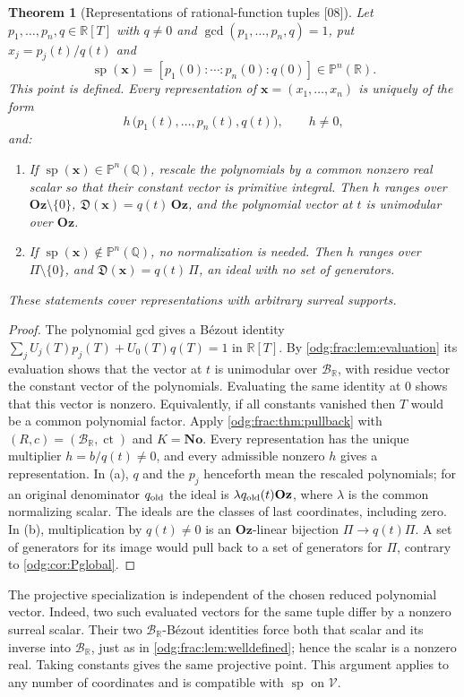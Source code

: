\documentclass[11pt,oneside]{article}
\numberwithin{equation}{section}
\newtheorem{theorem}{Theorem}[section]
\theoremstyle{definition}
\theoremstyle{remark}
\newcommand{\No}{\mathbf{No}}
\newcommand{\Oz}{\mathbf{Oz}}
\newcommand{\Q}{\mathbb Q}
\newcommand{\R}{\mathbb R}
\newcommand{\BR}{\mathcal B_{\R}}
\newcommand{\ct}{\operatorname{ct}}
\newcommand{\src}[1]{\textup{\textsf{\small[#1]}}}
\newcommand{\Den}{\mathfrak D}
\newcommand{\spz}{\operatorname{sp}}
\newcommand{\Vreg}{\mathcal V}
\begin{document}
\begin{theorem}[Representations of rational-function tuples \src{08}]\label{odg:frac:thm:main}
Let $p_1,\ldots,p_n,q\in\R[T]$ with $q\ne0$ and $\gcd(p_1,\ldots,p_n,q)=1$, put
$x_j=p_j(t)/q(t)$ and
\[
 \spz(\mathbf x)=[p_1(0):\cdots:p_n(0):q(0)]\in\mathbb P^n(\R).
\]
This point is defined. Every representation of $\mathbf x=(x_1,\ldots,x_n)$ is
uniquely of the form
\[
 h\,\bigl(p_1(t),\ldots,p_n(t),q(t)\bigr),\qquad h\ne0,
\]
and:
\begin{enumerate}[label=\textup{(\alph*)},leftmargin=*]
\item If $\spz(\mathbf x)\in\mathbb P^n(\Q)$, rescale the polynomials by a
common nonzero real scalar so that their constant vector is primitive integral.
Then $h$ ranges over $\Oz\setminus\{0\}$, $\Den(\mathbf x)=q(t)\,\Oz$, and the
polynomial vector at $t$ is unimodular over $\Oz$.
\item If $\spz(\mathbf x)\notin\mathbb P^n(\Q)$, no normalization is needed.
Then $h$ ranges over $\Pi\setminus\{0\}$, and $\Den(\mathbf x)=q(t)\,\Pi$, an
ideal with no set of generators.
\end{enumerate}
These statements cover representations with arbitrary surreal supports.
\end{theorem}
\begin{proof}
The polynomial gcd gives a B\'ezout identity
$\sum_jU_j(T)p_j(T)+U_0(T)q(T)=1$ in $\R[T]$. By \cref{odg:frac:lem:evaluation}
its evaluation shows that the vector at $t$ is unimodular over $\BR$, with
residue vector the constant vector of the polynomials. Evaluating the same
identity at $0$ shows that this vector is nonzero. Equivalently, if all
constants vanished then $T$ would be a common polynomial factor. Apply
\cref{odg:frac:thm:pullback} with $(R,c)=(\BR,\ct)$ and $K=\No$. Every
representation has the unique multiplier $h=b/q(t)\ne0$, and every admissible
nonzero $h$ gives a representation. In (a), $q$ and the $p_j$ henceforth
mean the rescaled polynomials; for an original denominator $q_{\rm old}$
the ideal is $\lambda q_{\rm old}(t)\Oz$, where $\lambda$ is the common
normalizing scalar. The ideals are the classes of last coordinates, including
zero. In (b), multiplication by $q(t)\ne0$ is an $\Oz$-linear bijection
$\Pi\to q(t)\Pi$. A set of generators for its image would pull back to a
set of generators for $\Pi$, contrary to \cref{odg:cor:Pglobal}.
\end{proof}

The projective specialization is independent of the chosen reduced
polynomial vector. Indeed, two such evaluated vectors for the same tuple
differ by a nonzero surreal scalar. Their two $\BR$-B\'ezout identities
force both that scalar and its inverse into $\BR$, just as in
\cref{odg:frac:lem:welldefined}; hence the scalar is a nonzero real.
Taking constants gives the same projective point. This argument applies to
any number of coordinates and is compatible with $\spz$ on $\Vreg$.
\end{document}

